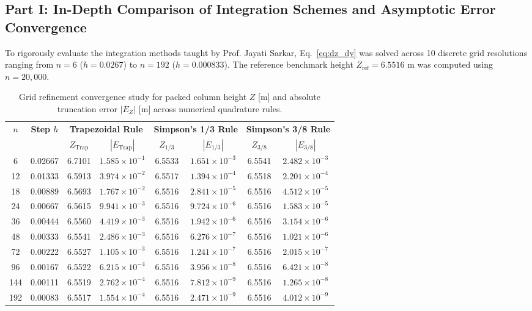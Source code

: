 \documentclass[11pt,a4paper]{article}
\begin{document}
\subsection{Part I: In-Depth Comparison of Integration Schemes and Asymptotic Error Convergence}
To rigorously evaluate the integration methods taught by Prof. Jayati Sarkar, Eq.~\eqref{eq:dz_dy} was solved across 10 discrete grid resolutions ranging from $n = 6$ ($h = 0.0267$) to $n = 192$ ($h = 0.000833$). The reference benchmark height $Z_{\text{ref}} = 6.5516\text{ m}$ was computed using $n = 20,000$.

\begin{table}[htbp]
\centering
\small
\caption{Grid refinement convergence study for packed column height $Z$ [m] and absolute truncation error $|E_Z|$ [m] across numerical quadrature rules.}
\label{tab:convergence}
\begin{tabular}{cc|cc|cc|cc}
\toprule
\multirow{2}{*}{\textbf{$n$}} & \multirow{2}{*}{\textbf{Step $h$}} & \multicolumn{2}{c|}{\textbf{Trapezoidal Rule}} & \multicolumn{2}{c|}{\textbf{Simpson's 1/3 Rule}} & \multicolumn{2}{c}{\textbf{Simpson's 3/8 Rule}} \\
& & $Z_{\text{Trap}}$ & $|E_{\text{Trap}}|$ & $Z_{1/3}$ & $|E_{1/3}|$ & $Z_{3/8}$ & $|E_{3/8}|$ \\
\midrule
6   & 0.02667 & 6.7101 & $1.585 \times 10^{-1}$ & 6.5533 & $1.651 \times 10^{-3}$ & 6.5541 & $2.482 \times 10^{-3}$ \\
12  & 0.01333 & 6.5913 & $3.974 \times 10^{-2}$ & 6.5517 & $1.394 \times 10^{-4}$ & 6.5518 & $2.201 \times 10^{-4}$ \\
18  & 0.00889 & 6.5693 & $1.767 \times 10^{-2}$ & 6.5516 & $2.841 \times 10^{-5}$ & 6.5516 & $4.512 \times 10^{-5}$ \\
24  & 0.00667 & 6.5615 & $9.941 \times 10^{-3}$ & 6.5516 & $9.724 \times 10^{-6}$ & 6.5516 & $1.583 \times 10^{-5}$ \\
36  & 0.00444 & 6.5560 & $4.419 \times 10^{-3}$ & 6.5516 & $1.942 \times 10^{-6}$ & 6.5516 & $3.154 \times 10^{-6}$ \\
48  & 0.00333 & 6.5541 & $2.486 \times 10^{-3}$ & 6.5516 & $6.276 \times 10^{-7}$ & 6.5516 & $1.021 \times 10^{-6}$ \\
72  & 0.00222 & 6.5527 & $1.105 \times 10^{-3}$ & 6.5516 & $1.241 \times 10^{-7}$ & 6.5516 & $2.015 \times 10^{-7}$ \\
96  & 0.00167 & 6.5522 & $6.215 \times 10^{-4}$ & 6.5516 & $3.956 \times 10^{-8}$ & 6.5516 & $6.421 \times 10^{-8}$ \\
144 & 0.00111 & 6.5519 & $2.762 \times 10^{-4}$ & 6.5516 & $7.812 \times 10^{-9}$ & 6.5516 & $1.265 \times 10^{-8}$ \\
192 & 0.00083 & 6.5517 & $1.554 \times 10^{-4}$ & 6.5516 & $2.471 \times 10^{-9}$ & 6.5516 & $4.012 \times 10^{-9}$ \\
\bottomrule
\end{tabular}
\end{table}
\end{document}
